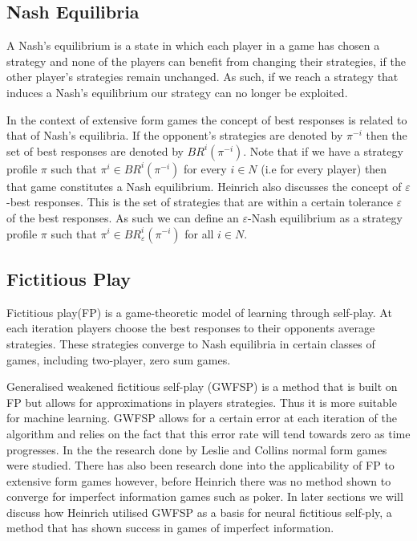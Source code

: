 \subsection{Nash Equilibria}\label{subsec:nashEquilibria}
A Nash's equilibrium is a state in which each player in a game has chosen a strategy and
none of the players can benefit from changing their strategies, if the other player's strategies remain unchanged.
As such, if we reach a strategy that induces a Nash's equilibrium our strategy can no longer be exploited.

In the context of extensive form games the concept of best responses is related to that of Nash's equilibria.
If the opponent's strategies are denoted by $\pi^{-i}$ then the set of best responses are denoted by
$BR^i(\pi^{-i})$.
Note that if we have a strategy profile $\pi$ such that $\pi^i\in BR^i(\pi^{-i})$ for every $i\in N$ (i.e
for every player) then that game constitutes a Nash equilibrium\citep{heinrich2017reinforcement}.
Heinrich also discusses the concept of $\varepsilon$-best responses.
This is the set of strategies that are within a certain tolerance $\varepsilon$ of the best responses.
As such we can define an $\varepsilon$-Nash equilibrium as a strategy profile $\pi$ such that
$\pi^i \in BR^i_\varepsilon (\pi^{-i})$ for all $i\in N$.

\subsection{Fictitious Play}\label{subsec:fictitiousPlay}
Fictitious play(FP) is a game-theoretic model of learning through self-play.
At each iteration players choose the best responses to their opponents average
strategies\citep{heinrich2017reinforcement}.
These strategies converge to Nash equilibria in certain classes of games, including two-player, zero sum games.

Generalised weakened fictitious self-play (GWFSP) is a method that is built on FP but allows for approximations
in players strategies\citep{leslie2006generalised}.
Thus it is more suitable for machine learning.
GWFSP allows for a certain error at each iteration of the algorithm and relies on the fact that this
error rate will tend towards zero as time progresses.
In the the research done by Leslie and Collins normal form games were studied.
There has also been research done into the applicability of FP to extensive form games however,
before Heinrich there was no method shown to converge for imperfect information games such as poker.
In later sections we will discuss how Heinrich utilised GWFSP as a basis for neural fictitious self-ply,
a method that has shown success in games of imperfect information.


